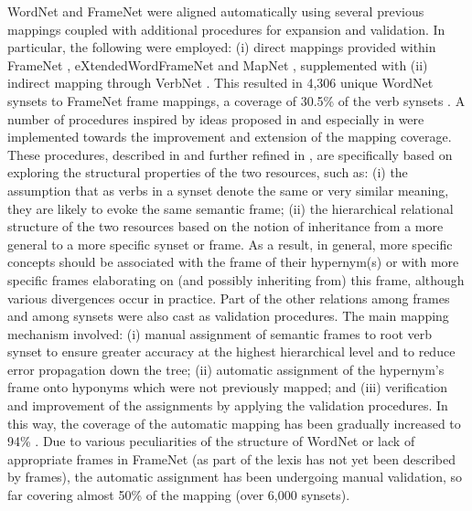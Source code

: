 \documentclass[output=paper,colorlinks,citecolor=brown]{langscibook}
\begin{document}
WordNet and FrameNet were aligned automatically using several previous mappings coupled with additional procedures for expansion and validation. In particular, the following were employed: (i) direct mappings provided within FrameNet \citep{Baker2009}, eXtendedWordFrameNet \citep{Laparra2010} and MapNet \citep{Tonelli2009}, supplemented with (ii) indirect mapping through VerbNet \citep{Palmer2009,Palmer2014}. This resulted in 4,306 unique WordNet synsets to FrameNet frame mappings, a coverage of 30.5\% of the verb synsets \citep[110]{LesevaStoyanova-CIT:2020}. A number of procedures inspired by ideas proposed in \citet{lopez-de-lacalle-etal-2014-predicate} and especially in \citet{Burchardt2005} were implemented towards the  improvement and extension of the mapping coverage. These procedures, described in \citet{Leseva2018} and further refined in \citet{StoyanovaLeseva2019,LesevaStoyanova2020}, are specifically based on exploring the structural properties of the two resources, such as: (i) the assumption that as verbs in a synset denote the same or very similar meaning, they are likely to evoke the same semantic frame; (ii) the hierarchical relational structure of the two resources based on the notion of inheritance from a more general to a more specific synset or frame. As a result, in general, more specific concepts should be associated with the frame of their hypernym(s) or with more specific frames elaborating on (and possibly inheriting from) this frame, although various divergences occur in practice. Part of the other relations among frames and among synsets were also cast as validation procedures. The main mapping mechanism involved: (i) manual assignment of semantic frames to root verb synset to ensure greater accuracy at the highest hierarchical level and to reduce error propagation down the tree; (ii) automatic assignment of the hypernym’s frame onto hyponyms which were not previously mapped; and (iii) verification and improvement of the assignments by applying the validation procedures. In this way, the coverage of the automatic mapping has been gradually increased to 94\% \citep[115–116]{LesevaStoyanova-CIT:2020}. Due to various peculiarities of the structure of WordNet or lack of appropriate frames in FrameNet (as part of the lexis has not yet been described by frames), the automatic assignment has been undergoing manual validation, so far covering almost 50\% of the mapping (over 6,000 synsets).  
 
\end{document}
